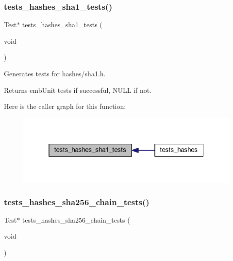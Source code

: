 \subsubsection{\texorpdfstring{tests\+\_\+hashes\+\_\+sha1\+\_\+tests()}{tests\_hashes\_sha1\_tests()}}
{\footnotesize\ttfamily Test$\ast$ tests\+\_\+hashes\+\_\+sha1\+\_\+tests (\begin{DoxyParamCaption}\item[{void}]{ }\end{DoxyParamCaption})}



Generates tests for hashes/sha1.\+h. 

\begin{DoxyReturn}{Returns}
emb\+Unit tests if successful, N\+U\+LL if not. 
\end{DoxyReturn}
Here is the caller graph for this function\+:
\nopagebreak
\begin{figure}[H]
\begin{center}
\leavevmode
\includegraphics[width=319pt]{group__unittests_ga5567d66422cdc40775eeacf6fa796893_icgraph}
\end{center}
\end{figure}
\mbox{\label{group__unittests_ga31217f1c8fb68025a8a9a17e1a9359b3}} 
\subsubsection{\texorpdfstring{tests\+\_\+hashes\+\_\+sha256\+\_\+chain\+\_\+tests()}{tests\_hashes\_sha256\_chain\_tests()}}
{\footnotesize\ttfamily Test$\ast$ tests\+\_\+hashes\+\_\+sha256\+\_\+chain\+\_\+tests (\begin{DoxyParamCaption}\item[{void}]{ }\end{DoxyParamCaption})}



